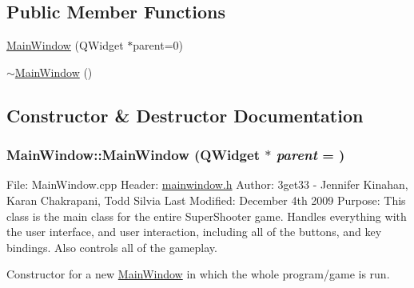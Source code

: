 \subsection*{Public Member Functions}
\begin{DoxyCompactItemize}
\item 
\hyperlink{class_main_window_a8b244be8b7b7db1b08de2a2acb9409db}{MainWindow} (QWidget $\ast$parent=0)
\item 
\hyperlink{class_main_window_ae98d00a93bc118200eeef9f9bba1dba7}{$\sim$MainWindow} ()
\end{DoxyCompactItemize}


\subsection{Constructor \& Destructor Documentation}
\hypertarget{class_main_window_a8b244be8b7b7db1b08de2a2acb9409db}{
\subsubsection[{MainWindow}]{\setlength{\rightskip}{0pt plus 5cm}MainWindow::MainWindow (QWidget $\ast$ {\em parent} = {})}}
\label{class_main_window_a8b244be8b7b7db1b08de2a2acb9409db}
File: MainWindow.cpp Header: \hyperlink{mainwindow_8h_source}{mainwindow.h} Author: 3get33 -\/ Jennifer Kinahan, Karan Chakrapani, Todd Silvia Last Modified: December 4th 2009 Purpose: This class is the main class for the entire SuperShooter game. Handles everything with the user interface, and user interaction, including all of the buttons, and key bindings. Also controls all of the gameplay.

Constructor for a new \hyperlink{class_main_window}{MainWindow} in which the whole program/game is run. 

